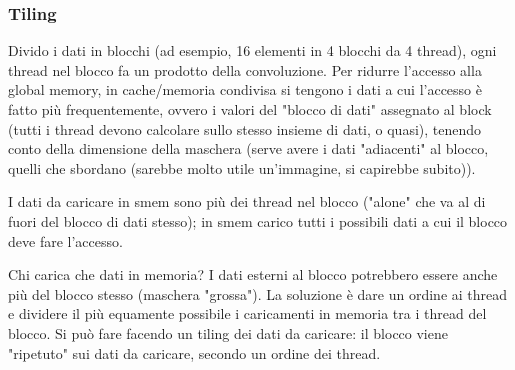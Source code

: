 
\subsubsection{Tiling}
Divido i dati in blocchi (ad esempio, 16 elementi in 4 blocchi da 4 thread), ogni thread nel blocco fa un prodotto della convoluzione. Per ridurre l'accesso alla global memory, in cache/memoria condivisa si tengono i dati a cui l'accesso è fatto più frequentemente, ovvero i valori del "blocco di dati" assegnato al block (tutti i thread devono calcolare sullo stesso insieme di dati, o quasi), tenendo conto della dimensione della maschera (serve avere i dati "adiacenti" al blocco, quelli che sbordano (sarebbe molto utile un'immagine, si capirebbe subito)).

I dati da caricare in smem sono più dei thread nel blocco ("alone" che va al di fuori del blocco di dati stesso); in smem carico tutti i possibili dati a cui il blocco deve fare l'accesso. 

Chi carica che dati in memoria? I dati esterni al blocco potrebbero essere anche più del blocco stesso (maschera "grossa"). La soluzione è dare un ordine ai thread e dividere il più equamente possibile i caricamenti in memoria tra i thread del blocco. Si può fare facendo un tiling dei dati da caricare: il blocco viene "ripetuto" sui dati da caricare, secondo un ordine dei thread.
